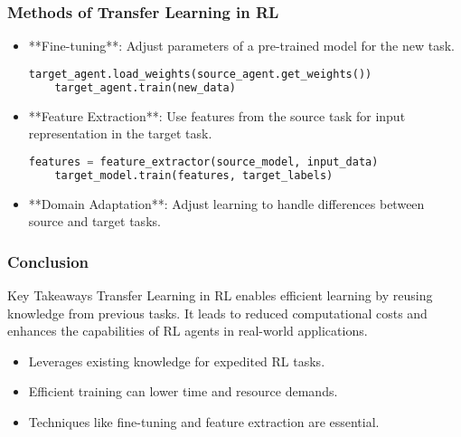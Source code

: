 \documentclass[aspectratio=169]{beamer}
\begin{document}
\begin{frame}[fragile]
  \frametitle{Methods of Transfer Learning in RL}
  \begin{itemize}
    \item **Fine-tuning**: Adjust parameters of a pre-trained model for the new task.
    \begin{lstlisting}[language=Python]
    target_agent.load_weights(source_agent.get_weights())
    target_agent.train(new_data)
    \end{lstlisting}
    
    \item **Feature Extraction**: Use features from the source task for input representation in the target task.
    \begin{lstlisting}[language=Python]
    features = feature_extractor(source_model, input_data)
    target_model.train(features, target_labels)
    \end{lstlisting}
    
    \item **Domain Adaptation**: Adjust learning to handle differences between source and target tasks.
  \end{itemize}
\end{frame}

\begin{frame}[fragile]
  \frametitle{Conclusion}
  \begin{block}{Key Takeaways}
    Transfer Learning in RL enables efficient learning by reusing knowledge from previous tasks. It leads to reduced computational costs and enhances the capabilities of RL agents in real-world applications.
  \end{block}
  
  \begin{itemize}
    \item Leverages existing knowledge for expedited RL tasks.
    \item Efficient training can lower time and resource demands.
    \item Techniques like fine-tuning and feature extraction are essential.
  \end{itemize}
\end{frame}
\end{document}
